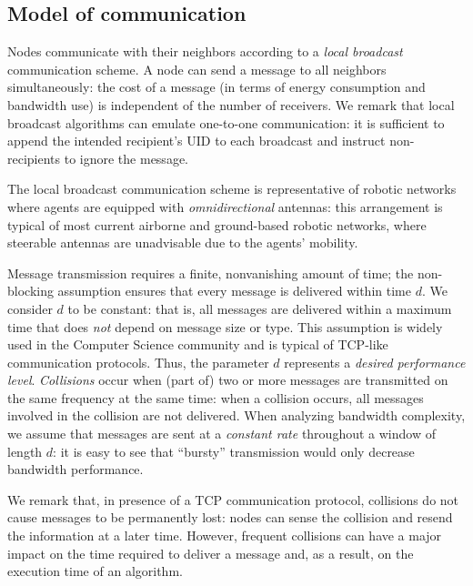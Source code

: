 \documentclass[letterpaper,10pt,conference]{ieeeconf}
\begin{document}
\subsection{Model of communication}
Nodes communicate with their neighbors according to a \emph{local broadcast} communication scheme. A node can send a message to all neighbors simultaneously: the cost of a message (in terms of energy consumption and bandwidth use)  is independent of the number of receivers. 
We remark that local broadcast algorithms can emulate one-to-one communication: it is sufficient to append the intended recipient's UID to each broadcast and instruct non-recipients to ignore the message. 

The local broadcast communication scheme is representative of robotic networks where agents are equipped with \emph{omnidirectional} antennas: this arrangement is typical of most current airborne and ground-based robotic networks, where steerable antennas are unadvisable due to the agents' mobility. 

Message transmission requires a finite, nonvanishing amount of time; the non-blocking assumption ensures that every message is delivered within time $d$.
We consider $d$ to be constant: that is, all messages are delivered within a maximum time that does \emph{not} depend on message size or type. This assumption is widely used in the Computer Science community \cite{NL:96} and is typical of TCP-like communication protocols.
Thus, the parameter $d$ represents a \emph{desired performance level}.
\emph{Collisions} occur when (part of) two or more messages are transmitted on the same frequency at the same time: when a collision occurs, all messages involved in the collision are not delivered. When analyzing bandwidth complexity, we assume that messages are sent at a \emph{constant rate} throughout a window of length $d$: it is easy to see that ``bursty'' transmission would only decrease bandwidth performance.

We remark that, in presence of a TCP communication protocol, collisions do not cause messages to be permanently lost: nodes can sense the collision and resend the information at a later time. However, frequent collisions can have a major impact on the time required to deliver a message and, as a result, on the execution time of an algorithm.
\end{document}
